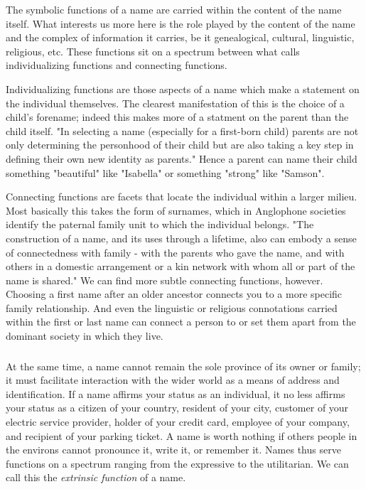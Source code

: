 The symbolic functions of a name are carried within the content of the name
itself. What interests us more here is the role played by the content of the
name and the complex of information it carries, be it genealogical, cultural,
linguistic, religious, etc. These functions sit on a spectrum between what
\textcite{finch08} calls individualizing functions and connecting functions.

Individualizing functions are those aspects of a name which make a statement on
the individual themselves. The clearest manifestation of this is the choice of a
child's forename; indeed this makes more of a statment on the parent than the
child itself. "In selecting a name (especially for a first-born child) parents
are not only determining the personhood of their child but are also taking a key
step in defining their own new identity as parents." \parencite[718]{finch08}
Hence a parent can name their child something "beautiful" like "Isabella" or
something "strong" like "Samson".

Connecting functions are facets that locate the individual within a larger
milieu. Most basically this takes the form of surnames, which in Anglophone
societies identify the paternal family unit to which the individual belongs.
"The construction of a name, and its uses through a lifetime, also can embody a
sense of connectedness with family - with the parents who gave the name, and
with others in a domestic arrangement or a kin network with whom all or part of
the name is shared." \parencite[711]{finch08} We can find more subtle connecting
functions, however. Choosing a first name after an older ancestor connects you
to a more specific family relationship. And even the linguistic or religious
connotations carried within the first or last name can connect a person to or
set them apart from the dominant society in which they live.

\subsubsection{}

At the same time, a name cannot remain the sole province of its owner or family;
it must facilitate interaction with the wider world as a means of address and
identification. If a name affirms your status as an individual, it no less
affirms your status as a citizen of your country, resident of your city,
customer of your electric service provider, holder of your credit card, employee
of your company, and recipient of your parking ticket. A name is worth nothing
if others people in the environs cannot pronounce it, write it, or remember it.
Names thus serve functions on a spectrum ranging from the expressive to the
utilitarian. We can call this the \textit{extrinsic function} of a name.

